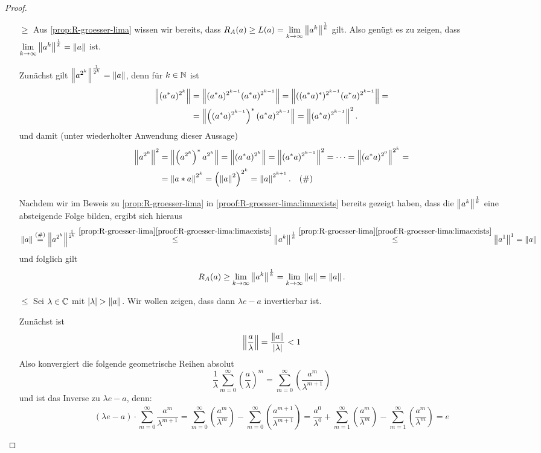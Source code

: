\begin{proof}

\begin{itemize}
	\item[\glqq$\geq$\grqq] Aus \cref{prop:R-groesser-lima} wissen wir bereits, dass $R_A(a) \geq L(a) = \underset{k\to\infty}{\lim}\left\lVert a^k\right\rVert^\frac{1}{k}$ gilt. Also genügt es zu zeigen, dass $\underset{k\to\infty}{\lim}\left\lVert a^k\right\rVert^\frac{1}{k} = \left\lVert a\right\rVert$ ist.
	
Zunächst gilt $\left\lVert a^{2^k}\right\rVert^\frac{1}{2^k} = \left\lVert a\right\rVert$, denn für $k \in \mathbb{N}$ ist
	\begin{align*}
	\left\lVert(a^*a)^{2^k}\right\rVert &= \left\lVert(a^*a)^{2^{k-1}}(a^*a)^{2^{k-1}}\right\rVert = \left\lVert((a^*a)^*)^{2^{k-1}}(a^*a)^{2^{k-1}}\right\rVert = \\
	&= \left\lVert\left((a^*a)^{2^{k-1}}\right)^*(a^*a)^{2^{k-1}}\right\rVert = \left\lVert(a^*a)^{2^{k-1}}\right\rVert^2.
	\end{align*}
und damit (unter wiederholter Anwendung dieser Aussage)
	\begin{align*}
	\left\lVert a^{2^k}\right\rVert^2 &= \left\lVert\left(a^{2^k}\right)^*a^{2^k}\right\rVert = \left\lVert(a^*a)^{2^k}\right\rVert = \left\lVert(a^*a)^{2^{k-1}}\right\rVert^2 = \dots = \left\lVert(a^*a)^{2^{0}}\right\rVert^{2^k} = \\
	&= \left\lVert a*a\right\rVert^{2^k} = \left(\left\lVert a\right\rVert^2\right)^{2^k} = \left\lVert a\right\rVert^{2^{k+1}}. \quad (\#)
	\end{align*}	
	
Nachdem wir im Beweis zu \cref{prop:R-groesser-lima} in \ref{proof:R-groesser-lima:limaexists} bereits gezeigt haben, dass die $\left\lVert a^k\right\rVert^\frac{1}{k}$ eine absteigende Folge bilden, ergibt sich hieraus
	\[\norm{a} \overset{(\#)}{=} \norm{a^{2^k}}^\frac{1}{2^k} \overset{\ref*{prop:R-groesser-lima}\ref*{proof:R-groesser-lima:limaexists}}{\leq} \norm{a^{k}}^\frac{1}{k} \overset{\ref*{prop:R-groesser-lima}\ref*{proof:R-groesser-lima:limaexists}}{\leq} \norm{a^1}^1 = \norm{a}\]
und folglich gilt
	\[R_A(a) \geq \underset{k\to\infty}{\lim}\left\lVert a^k\right\rVert^\frac{1}{k} = \underset{k\to\infty}{\lim}\left\lVert a\right\rVert = \left\lVert a\right\rVert.\]	
	
	
	\item[\glqq$\leq$\grqq] Sei $\lambda \in \mathbb{C}$ mit $|\lambda| > \left\lVert a\right\rVert$. Wir wollen zeigen, dass dann $\lambda e - a$ invertierbar ist.

Zunächst ist
	\[\left\lVert\frac{a}{\lambda}\right\rVert = \frac{\left\lVert a\right\rVert}{|\lambda|} < 1\]
Also konvergiert die folgende geometrische Reihen absolut
	\[\frac{1}{\lambda}\sum_{m=0}^\infty\left(\frac{a}{\lambda}\right)^m = \sum_{m=0}^\infty\left(\frac{a^m}{\lambda^{m+1}}\right) \]
und ist das Inverse zu $\lambda e - a$, denn:
	\[(\lambda e - a)\cdot \sum_{m=0}^\infty\frac{a^m}{\lambda^{m+1}} = \sum_{m=0}^\infty\left(\frac{a^m}{\lambda^{m}}\right) - \sum_{m=0}^\infty\left(\frac{a^{m+1}}{\lambda^{m+1}}\right) = \frac{a^0}{\lambda^0} +  \sum_{m=1}^\infty\left(\frac{a^m}{\lambda^{m}}\right) - \sum_{m=1}^\infty\left(\frac{a^m}{\lambda^{m}}\right) = e\]
	

\end{itemize}
\end{proof}
